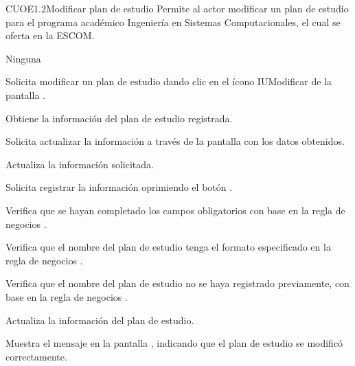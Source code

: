 \begin{UseCase}{CUOE1.2}{Modificar plan de estudio}{	
	Permite al actor modificar un plan de estudio para el programa académico Ingeniería en Sistemas Computacionales, el cual se oferta en la ESCOM.
}
{\begin{UClist}
			\UCli Ninguna
		\end{UClist}
	}	
\end{UseCase}

\begin{UCtrayectoria}
	\UCpaso [\UCactor] Solicita modificar un plan de estudio dando clic en el ícono IUModificar de la pantalla . 
	
	\UCpaso [\UCsist] Obtiene la información del plan de estudio registrada.
	
	\UCpaso [\UCsist] Solicita actualizar la información a través de la pantalla  con los datos obtenidos.
	
	\UCpaso [\UCactor] Actualiza la información solicitada. \label{CUOE1.2:CompletaInfo}
	
	\UCpaso [\UCactor] Solicita registrar la información oprimiendo el botón . 
	
	\UCpaso [\UCsist] Verifica que se hayan completado los campos obligatorios con base en la regla de negocios . 
	
	\UCpaso [\UCsist] Verifica que el nombre del plan de estudio tenga el formato especificado en la regla de negocios . 
	
	\UCpaso [\UCsist] Verifica que el nombre del plan de estudio no se haya registrado previamente, con base en la regla de negocios . 
	
	\UCpaso [\UCsist] Actualiza la información del plan de estudio.
	
	\UCpaso [\UCsist] Muestra el mensaje  en la pantalla , indicando que el plan de estudio se modificó correctamente.	
	
\end{UCtrayectoria}

